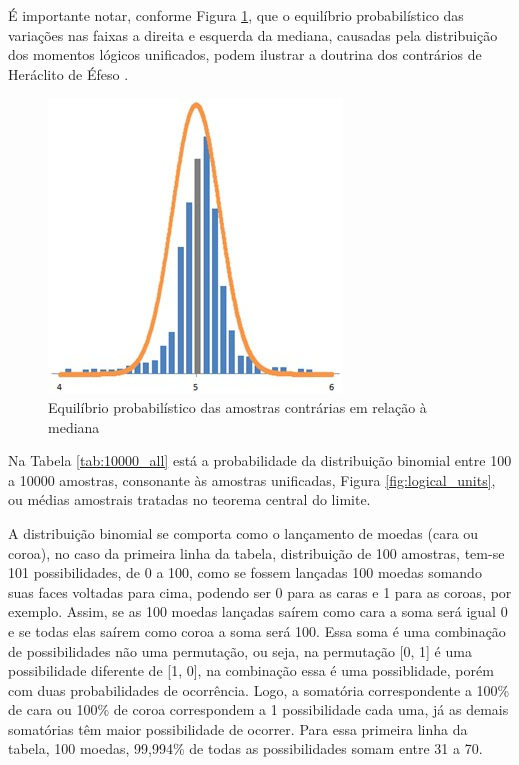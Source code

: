 É importante notar, conforme Figura \ref{fig:trend_chart_of_normal_distribution}, que o equilíbrio probabilístico das variações nas faixas a direita e esquerda da mediana, causadas pela distribuição dos momentos lógicos unificados, podem ilustrar a doutrina dos contrários de Heráclito de Éfeso \cite{brasilescola_heraclito}.
\begin{figure}[H]
\caption{Equilíbrio probabilístico das amostras contrárias em relação à mediana}
\label{fig:trend_chart_of_normal_distribution}
\centering
\includegraphics[scale=1.1]{sections/images/trend_chart_of_normal_distribution.jpg}
\end{figure}

Na Tabela \ref{tab:10000_all} está a probabilidade da distribuição binomial entre 100 a 10000 amostras, consonante às amostras unificadas, Figura \ref{fig:logical_units}, ou médias amostrais tratadas no teorema central do limite.

A distribuição binomial se comporta como o lançamento de moedas (cara ou coroa), no caso da primeira linha da tabela, distribuição de 100 amostras, tem-se 101 possibilidades, de 0 a 100, como se fossem lançadas 100 moedas somando suas faces voltadas para cima, podendo ser 0 para as caras e 1 para as coroas, por exemplo. Assim, se as 100 moedas lançadas saírem como cara a soma será igual 0 e se todas elas saírem como coroa a soma será 100. Essa soma é uma combinação de possibilidades não uma permutação, ou seja, na permutação [0, 1] é uma possibilidade diferente de [1, 0], na combinação essa é uma possiblidade, porém com duas probabilidades de ocorrência. Logo, a somatória correspondente a 100\% de cara ou 100\% de coroa correspondem a 1 possibilidade cada uma, já as demais somatórias têm maior possibilidade de ocorrer. Para essa primeira linha da tabela, 100 moedas, 99,994\% de todas as possibilidades somam entre 31 a 70. 

